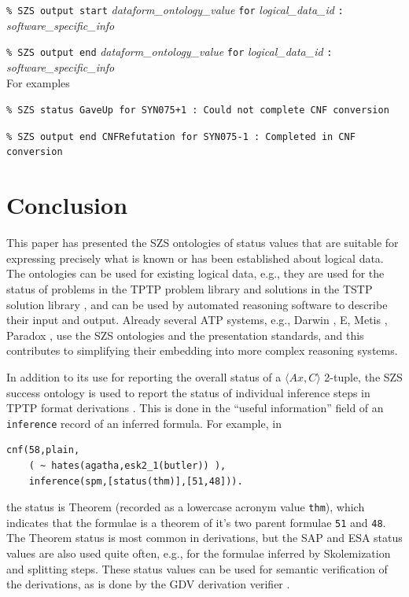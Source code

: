 \documentclass[a4paper]{easychair}
\begin{document}
{\tt \% SZS output start} {\em dataform\_ontology\_value} {\tt for} {\em logical\_data\_id} {\tt :} {\em software\_specific\_info}

{\tt \% SZS output end} {\em dataform\_ontology\_value} {\tt for} {\em logical\_data\_id} {\tt :} {\em software\_specific\_info}\\
For examples

{\tt \% SZS status GaveUp for SYN075+1 :~Could not complete CNF conversion}

{\tt \% SZS output end CNFRefutation for SYN075-1 :~Completed in CNF conversion}

\section{Conclusion}
\label{Conclusion}

This paper has presented the SZS ontologies of status values that are 
suitable for expressing precisely what is known or has been established 
about logical data.
The ontologies can be used for existing logical data, e.g., they are used
for the status of problems in the TPTP problem library \cite{SS98-JAR} and
solutions in the TSTP solution library \cite{Sut-TSTP-URL}, and can be used by
automated reasoning software to describe their input and output.
Already several ATP systems, e.g., Darwin \cite{BFT04}, E, Metis \cite{Hur03},
Paradox \cite{CS03}, use the SZS ontologies and the presentation standards,
and this contributes to simplifying their embedding into more complex
reasoning systems.

In addition to its use for reporting the overall status of a
$\langle Ax, C \rangle$ 2-tuple, the SZS success ontology is used
to report the status of individual inference steps in TPTP format
derivations \cite{SS+06}.
This is done in the ``useful information'' field of an {\tt inference}
record of an inferred formula.
For example, in
\begin{verbatim}
cnf(58,plain,
    ( ~ hates(agatha,esk2_1(butler)) ),
    inference(spm,[status(thm)],[51,48])).
\end{verbatim}
the status is Theorem (recorded as a lowercase acronym value {\tt thm}),
which indicates that the formulae is a theorem of it's two parent formulae
{\tt 51} and {\tt 48}.
The Theorem status is most common in derivations, but the SAP and ESA status
values are also used quite often, e.g., for the formulae inferred by
Skolemization and splitting steps.
These status values can be used for semantic verification of the derivations,
as is done by the GDV derivation verifier \cite{Sut06}.
\end{document}
